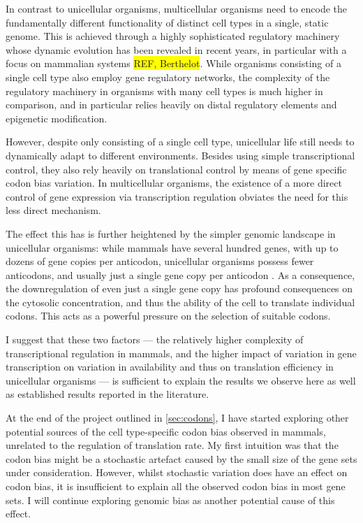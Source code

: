 In contrast to unicellular organisms, multicellular organisms need to encode the
fundamentally different functionality of distinct cell types in a single, static
genome. This is achieved through a highly sophisticated regulatory machinery
whose dynamic evolution has been revealed in recent years, in particular with a
focus on mammalian systems \colorbox{yellow}{REF, Berthelot}. While  organisms
consisting of a single cell type also employ gene regulatory networks, the
complexity of the regulatory machinery in organisms with many cell types is much
higher in comparison, and in particular relies heavily on distal regulatory
elements and epigenetic modification.

However, despite only consisting of a single cell type, unicellular life still
needs to dynamically adapt to different environments. Besides using simple
transcriptional control, they also rely heavily on translational control by
means of gene specific codon bias variation. In multicellular organisms, the
existence of a more direct control of gene expression via transcription
regulation obviates the need for this less direct mechanism.

The effect this has is further heightened by the simpler genomic \trna landscape
in unicellular organisms: while mammals have several hundred \trna genes, with
up to dozens of gene copies per anticodon, unicellular organisms possess fewer
anticodons, and usually just a single \trna gene copy per anticodon
\citep{Chan:2009}. As a consequence, the downregulation of even just a single
\trna gene copy has profound consequences on the cytosolic \trna concentration,
and thus the ability of the cell to translate individual codons. This acts as a
powerful pressure on the selection of suitable codons.

I suggest that these two factors — the relatively higher complexity of
transcriptional regulation in mammals, and the higher impact of variation in
\trna gene transcription on variation in
\trna availability and thus on translation efficiency in unicellular organisms —
is sufficient to explain the results we observe here as well as established
results reported in the literature.


At the end of the project outlined in \cref{sec:codons}, I have started
exploring other potential sources of the cell type-specific codon bias observed
in mammals, unrelated to the regulation of translation rate. My first intuition
was that the codon bias might be a stochastic artefact caused by the small size
of the gene sets under consideration. However, whilst stochastic variation does
have an effect on codon bias, it is insufficient to explain all the observed
codon bias in most gene sets. I will continue exploring genomic \gc bias as
another potential cause of this effect.

